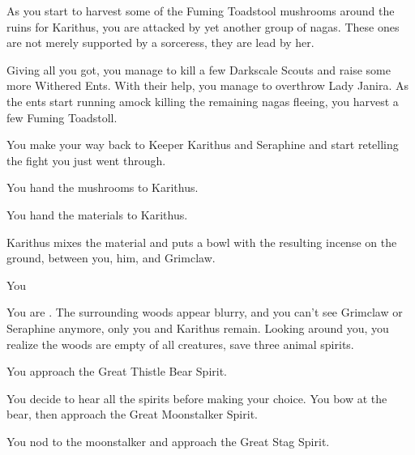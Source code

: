 As you start to harvest some of the Fuming Toadstool mushrooms around the ruins for Karithus, you are attacked by yet another group of nagas. These ones are not merely supported by a sorceress, they are lead by her.


Giving all you got, you manage to kill a few Darkscale Scouts and raise some more Withered Ents. With their help, you manage to overthrow Lady Janira. As the ents start running amock killing the remaining nagas fleeing, you harvest a few Fuming Toadstoll.

You make your way back to Keeper Karithus and Seraphine and start retelling the fight you just went through.


You hand the mushrooms to Karithus.



You hand the materials to Karithus.


Karithus mixes the material and puts a bowl with the resulting incense on the ground, between you, him, and Grimclaw.



You 

You are . The surrounding woods appear blurry, and you can't see Grimclaw or Seraphine anymore, only you and Karithus remain. Looking around you, you realize the woods are empty of all creatures, save three animal spirits.

You approach the Great Thistle Bear Spirit.


You decide to hear all the spirits before making your choice. You bow at the bear, then approach the Great Moonstalker Spirit.


You nod to the moonstalker and approach the Great Stag Spirit.

